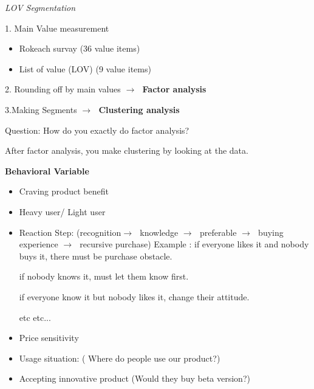 \documentclass[12pt]{article}
\newcommand{\ra}{$\rightarrow \text{ }$}
\newcommand{\sk}{\smallskip}
\begin{document}
\sk

{\large \textit{LOV Segmentation}}

\sk

1. Main Value measurement
\begin{itemize}
	\item  Rokeach survay (36 value items)
	\item List of value (LOV) (9 value items)

\end{itemize}

2. Rounding off by main values \ra \textbf{Factor analysis}

3.Making Segments \ra \textbf{Clustering analysis}

\begin{tcolorbox}
	Question: How do you exactly do factor analysis?
\end{tcolorbox}

After factor analysis, you make clustering by looking at the data.


\sk

\textbf{Behavioral Variable}

\begin{itemize}
	\item Craving product benefit
	\item Heavy user/ Light user
	\item Reaction Step: (recognition\ra knowledge \ra preferable \ra buying experience \ra recursive purchase)
	Example :
	if everyone likes it and nobody buys it, there must be purchase obstacle.

	if nobody knows it, must let them know first.

	if everyone know it but nobody likes it, change their attitude.

	etc etc...
	\item Price sensitivity
	\item Usage situation: ( Where do people use our product?)
	\item Accepting innovative product (Would they buy beta version?)

\end{itemize}
\end{document}
